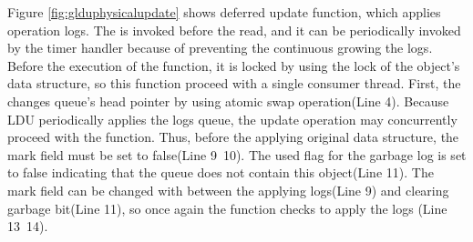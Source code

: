 
Figure \ref{fig:glduphysicalupdate} shows deferred update function, which
applies operation logs.
The  is invoked before the read, and it can be
periodically invoked by the timer handler because of preventing the continuous
growing the logs.
Before the execution of the  function, it is locked by using
the lock of the object's data structure, so this function proceed with a single
consumer thread.
First, the  changes queue's head pointer by using atomic swap
operation(Line 4).
Because LDU periodically applies the logs queue, the update operation may 
concurrently proceed with the  function.
Thus, before the applying original data structure, the mark field must be set
to false(Line 9~10).
The used flag for the garbage log is set to false indicating that the queue
does not contain this object(Line 11).
The mark field can be changed with between the applying logs(Line 9) and
clearing garbage bit(Line 11), so once again the  function
checks to apply the logs (Line 13~14).

